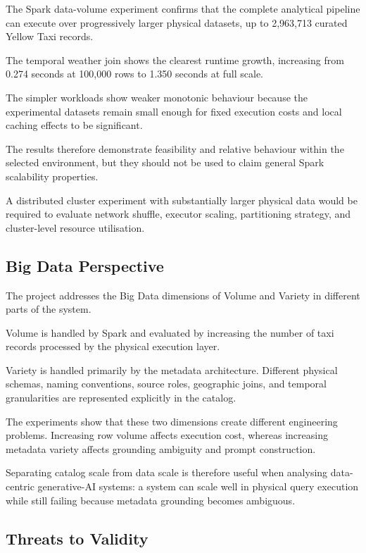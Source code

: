 The Spark data-volume experiment confirms that the complete analytical
pipeline can execute over progressively larger physical datasets, up to
2,963,713 curated Yellow Taxi records.

The temporal weather join shows the clearest runtime growth, increasing from
0.274 seconds at 100,000 rows to 1.350 seconds at full scale.

The simpler workloads show weaker monotonic behaviour because the experimental
datasets remain small enough for fixed execution costs and local caching
effects to be significant.

The results therefore demonstrate feasibility and relative behaviour within
the selected environment, but they should not be used to claim general Spark
scalability properties.

A distributed cluster experiment with substantially larger physical data
would be required to evaluate network shuffle, executor scaling, partitioning
strategy, and cluster-level resource utilisation.


\subsection{Big Data Perspective}

The project addresses the Big Data dimensions of Volume and Variety in
different parts of the system.

Volume is handled by Spark and evaluated by increasing the number of taxi
records processed by the physical execution layer.

Variety is handled primarily by the metadata architecture. Different physical
schemas, naming conventions, source roles, geographic joins, and temporal
granularities are represented explicitly in the catalog.

The experiments show that these two dimensions create different engineering
problems. Increasing row volume affects execution cost, whereas increasing
metadata variety affects grounding ambiguity and prompt construction.

Separating catalog scale from data scale is therefore useful when analysing
data-centric generative-AI systems: a system can scale well in physical query
execution while still failing because metadata grounding becomes ambiguous.


\subsection{Threats to Validity}

